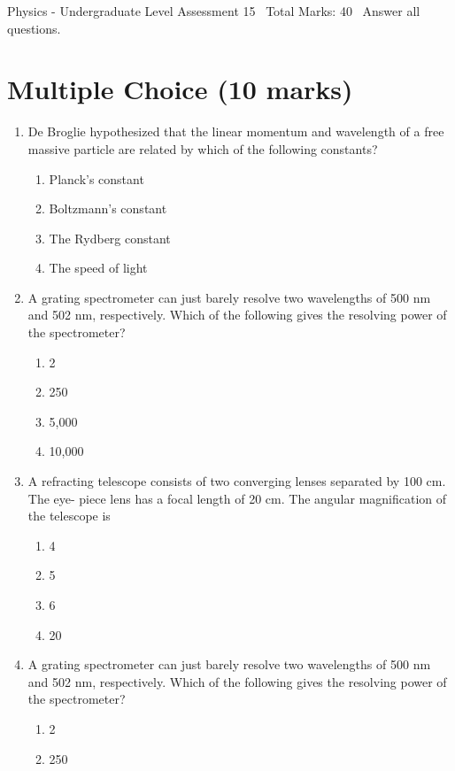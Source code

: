 \documentclass[12pt]{article}
\begin{document}
\begin{center}
Physics - Undergraduate Level Assessment 15 \
Total Marks: 40 \
Answer all questions.
\end{center}

\section*{Multiple Choice (10 marks)}
\begin{enumerate}[label=\arabic*.]
\item De Broglie hypothesized that the linear momentum and wavelength of a free massive particle are related by which of the following constants?
\begin{enumerate}[label=(\alph*)]
    \item Planck's constant
    \item Boltzmann's constant
    \item The Rydberg constant
    \item The speed of light
\end{enumerate}
\item A grating spectrometer can just barely resolve two wavelengths of 500 nm and 502 nm, respectively. Which of the following gives the resolving power of the spectrometer?
\begin{enumerate}[label=(\alph*)]
    \item 2
    \item 250
    \item 5,000
    \item 10,000
\end{enumerate}
\item A refracting telescope consists of two converging lenses separated by 100 cm. The eye- piece lens has a focal length of 20 cm. The angular magnification of the telescope is
\begin{enumerate}[label=(\alph*)]
    \item 4
    \item 5
    \item 6
    \item 20
\end{enumerate}
\item A grating spectrometer can just barely resolve two wavelengths of 500 nm and 502 nm, respectively. Which of the following gives the resolving power of the spectrometer?
\begin{enumerate}[label=(\alph*)]
    \item 2
    \item 250

\end{enumerate}
\end{enumerate}
\end{document}
